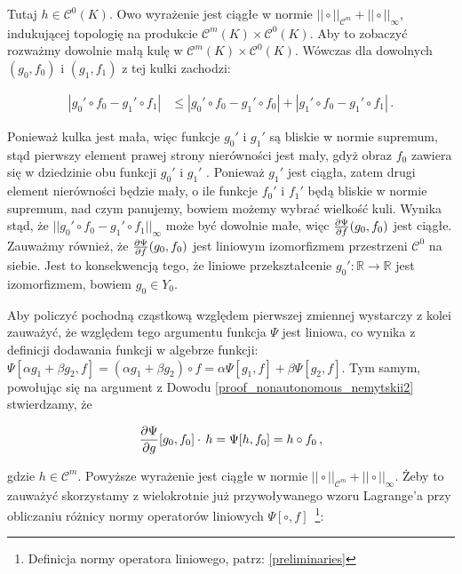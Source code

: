Tutaj $h \in \mathcal{C}^{0}(K)$. Owo wyrażenie jest ciągłe w normie $|| \circ ||_{\mathcal{C}^{m}} + || \circ ||_{\infty}$, indukującej topologię na produkcie $\mathcal{C}^{m}(K) \times \mathcal{C}^{0}(K)$. Aby to zobaczyć rozważmy dowolnie małą kulę w $\mathcal{C}^{m}(K) \times \mathcal{C}^{0}(K)$. Wówczas dla dowolnych $(g_0, f_0)$ i $(g_1, f_1)$ z tej kulki zachodzi:

\begin{align*}
	| g_0' \circ f_0 - g_1'\circ f_1 | &\leq |g_0' \circ f_0 - g_1' \circ f_0| + |g_1' \circ f_0 - g_1' \circ f_1| \,.
\end{align*}

	Ponieważ kulka jest mała, więc funkcje $g_0'$ i $g_1'$ są bliskie w normie supremum, stąd pierwszy element prawej strony nierówności jest mały, gdyż obraz $f_0$ zawiera się w dziedzinie obu funkcji $g_0'$ i $g_1'$ . Ponieważ $g_1'$ jest ciągła, zatem drugi element nierówności będzie mały, o ile funkcje $f_0'$ i $f_1'$ będą bliskie	w normie supremum, nad czym panujemy, bowiem możemy wybrać wielkość kuli. Wynika stąd, że $||g_0' \circ f_0 - g_1'\circ f_1  ||_{\infty}$ może być dowolnie małe, więc $\frac{\partial \Psi}{\partial f}(g_0,f_0) $ jest ciągłe. Zauważmy również, że $\frac{\partial \Psi}{\partial f}(g_0,f_0) $ jest liniowym izomorfizmem przestrzeni $\mathcal{C}^{0}$ na siebie. Jest to konsekwencją tego, że liniowe przekształcenie $g_0': \mathbb{R} \rightarrow \mathbb{R}$ jest izomorfizmem, bowiem $g_0 \in Y_0$.
	
 
Aby policzyć pochodną cząstkową względem pierwszej zmiennej wystarczy z kolei zauważyć, że względem tego argumentu funkcja $\Psi$ jest liniowa, co wynika z definicji dodawania funkcji w algebrze funkcji: $\Psi[\alpha g_1 + \beta g_2, f] = (\alpha g_1 + \beta g_2) \circ f = \alpha \Psi[g_1, f] + \beta \Psi[g_2,f]$. Tym samym, powołując się na argument z Dowodu \ref{proof_nonautonomous_nemytskii2} stwierdzamy, że 

\begin{equation*}
	\frac{\partial \Psi}{\partial g}[g_0,f_0] \cdot\, h = \Psi[h, f_0] = h \circ f_0\,,
\end{equation*}

gdzie $h \in \mathcal{C}^{m}$. Powyższe wyrażenie jest ciągłe w normie $|| \circ ||_{\mathcal{C}^{m}} + || \circ ||_{\infty}$. Żeby to zauważyć skorzystamy z wielokrotnie już przywoływanego wzoru Lagrange'a przy obliczaniu różnicy normy operatorów liniowych $\Psi[\circ, f]$~\footnote{Definicja normy operatora liniowego, patrz: \ref{preliminaries}}:

